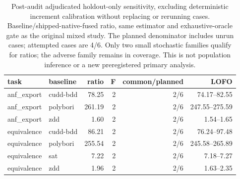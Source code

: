 \begin{table}[tbp]
\centering\scriptsize
\setlength{\tabcolsep}{3pt}
\caption{Post-audit adjudicated holdout-only sensitivity, excluding deterministic increment calibration without replacing or rerunning cases. Baseline/shipped-native-fused ratio, same estimator and exhaustive-oracle gate as the original mixed study. The planned denominator includes unrun cases; attempted cases are 4/6. Only two small stochastic families qualify for ratios; the adverse family remains in coverage. This is not population inference or a new preregistered primary analysis.}
\label{tab:current-holdout}
\begin{tabular}{llrrrr}
\toprule
task & baseline & ratio & F & common/planned & LOFO \\
\midrule
anf\_export & cudd-bdd & 78.25 & 2 & 2/6 & 74.17--82.55 \\
anf\_export & polybori & 261.19 & 2 & 2/6 & 247.55--275.59 \\
anf\_export & zdd & 1.60 & 2 & 2/6 & 1.54--1.65 \\
equivalence & cudd-bdd & 86.21 & 2 & 2/6 & 76.24--97.48 \\
equivalence & polybori & 255.54 & 2 & 2/6 & 245.58--265.89 \\
equivalence & sat & 7.22 & 2 & 2/6 & 7.18--7.27 \\
equivalence & zdd & 1.96 & 2 & 2/6 & 1.63--2.35 \\
\bottomrule
\end{tabular}
\end{table}
